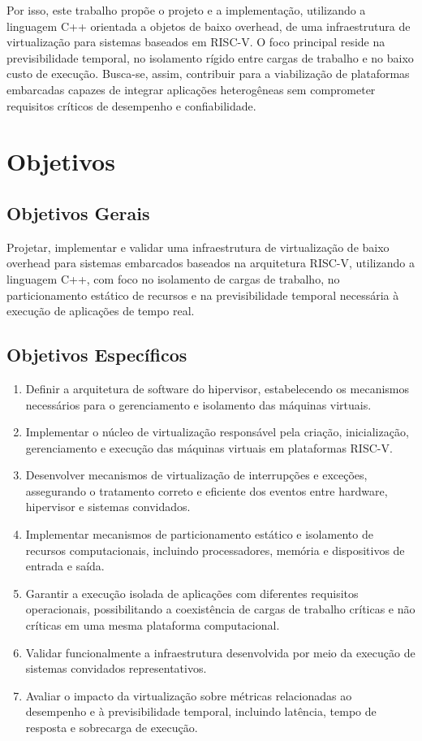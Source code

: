 Por isso, este trabalho propõe o projeto e a implementação, utilizando a linguagem C++ orientada a objetos de baixo overhead, de uma infraestrutura de virtualização para sistemas
baseados em RISC-V. O foco principal reside na previsibilidade temporal, no isolamento rígido entre cargas de trabalho e no baixo custo de execução. Busca-se, assim, contribuir para
a viabilização de plataformas embarcadas capazes de integrar aplicações heterogêneas sem comprometer requisitos críticos de desempenho e confiabilidade.

\section{Objetivos}

\subsection{Objetivos Gerais}

Projetar, implementar e validar uma infraestrutura de virtualização de baixo overhead para sistemas embarcados baseados na arquitetura RISC-V, utilizando a linguagem C++,
com foco no isolamento de cargas de trabalho, no particionamento estático de recursos e na previsibilidade temporal necessária à execução de aplicações de tempo real.

\subsection{Objetivos Específicos}

\begin{enumerate}
\item Definir a arquitetura de software do hipervisor, estabelecendo os mecanismos necessários para o gerenciamento e isolamento das máquinas virtuais.
\item Implementar o núcleo de virtualização responsável pela criação, inicialização, gerenciamento e execução das máquinas virtuais em plataformas RISC-V.
\item Desenvolver mecanismos de virtualização de interrupções e exceções, assegurando o tratamento correto e eficiente dos eventos entre hardware, hipervisor e sistemas convidados.
\item Implementar mecanismos de particionamento estático e isolamento de recursos computacionais, incluindo processadores, memória e dispositivos de entrada e saída.
\item Garantir a execução isolada de aplicações com diferentes requisitos operacionais, possibilitando a coexistência de cargas de trabalho críticas e não críticas em uma mesma plataforma computacional.
\item Validar funcionalmente a infraestrutura desenvolvida por meio da execução de sistemas convidados representativos.
\item Avaliar o impacto da virtualização sobre métricas relacionadas ao desempenho e à previsibilidade temporal, incluindo latência, tempo de resposta e sobrecarga de execução.
\end{enumerate}

